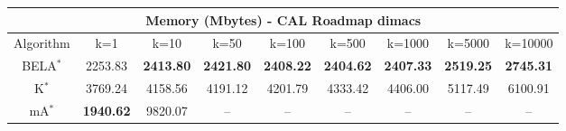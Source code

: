 \begin{tabular}{c|cccccccc}\toprule
\multicolumn{9}{c}{Memory (Mbytes) - CAL Roadmap dimacs}\\ \midrule
Algorithm & k=1 & k=10 & k=50 & k=100 & k=500 & k=1000 & k=5000 & k=10000 \\ \midrule
BELA$^*$ & 2253.83 & \textbf{2413.80} & \textbf{2421.80} & \textbf{2408.22} & \textbf{2404.62} & \textbf{2407.33} & \textbf{2519.25} & \textbf{2745.31} \\
K$^*$ & 3769.24 & 4158.56 & 4191.12 & 4201.79 & 4333.42 & 4406.00 & 5117.49 & 6100.91 \\
mA$^*$ & \textbf{1940.62} & 9820.07 & -- & -- & -- & -- & -- & -- \\ \bottomrule 
\end{tabular}
